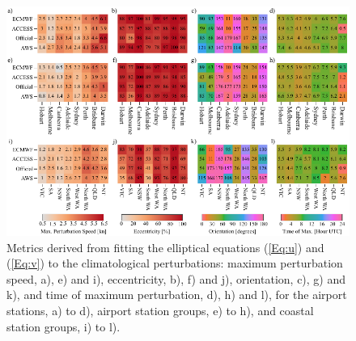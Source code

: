\documentclass{ametsoc}
\begin{document}
\begin{figure}
\centering
\includegraphics[width=39pc]{ellipse_fits.pdf}
\caption{Metrics derived from fitting the elliptical equations (\ref{Eq:u}) and (\ref{Eq:v}) to the climatological perturbations: maximum perturbation speed, a), e) and i), eccentricity, b), f) and j), orientation, c), g) and k), and time of maximum perturbation, d), h) and l), for the airport stations, a) to d), airport station groups, e) to h), and coastal station groups, i) to l).}
\label{Fig:ellipse_fits}
\end{figure}
\end{document}
